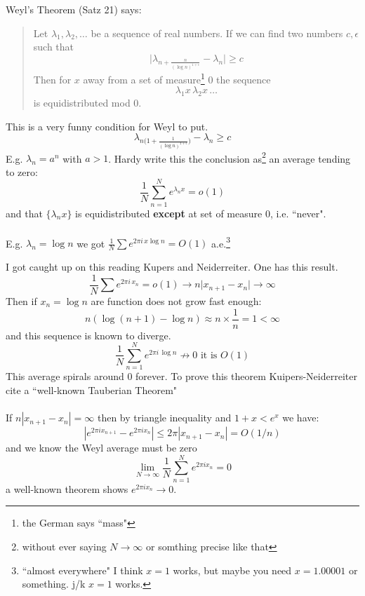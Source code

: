 \documentclass[12pt]{article}
\begin{document}
\newpage

\noindent Weyl's Theorem (Satz 21) says:
\begin{quotation}
Let $\lambda_1, \lambda_2, \dots $ be a sequence of real numbers. If we can find two numbers $c, \epsilon$ such that $$ \big| 
\lambda_{n + \frac{n}{(\log n)^{1+\epsilon}}} - \lambda_n\big| \geq c $$
Then for $x$ away from a set of measure\footnote{the German says ``mass"} 0 the sequence
$$ \lambda_1 x \, \lambda_2 x \, \dots $$
is equidistributed mod $0$.
\end{quotation}
This is a very funny condition for Weyl to put.
$$ \lambda_{n\big( 1 + \frac{1}{(\log n)^{1+\epsilon}}\big)} - \lambda_n \geq c$$
E.g. $\lambda_n = a^n$ with $a > 1$.  Hardy write this the conclusion as\footnote{without ever saying $N \to \infty$ or somthing precise like that} an average tending to zero:
$$ \frac{1}{N}\sum_{n=1}^N e^{\lambda_n x} = o(1)$$
and that $\{\lambda_n x\}$ is equidistributed \textbf{except} at set of measure 0, i.e. ``never". \\ \\
E.g. $\lambda_n = \log n$ we got $\frac{1}{N}\sum e^{2\pi i \, x \log n}  = O(1)$ a.e.\footnote{``almost everywhere" I think $x = 1$ works, but maybe you need $x = 1.00001$ or something.  j/k $x = 1$ works.}


\newpage

\noindent I got caught up on this reading Kupers and Neiderreiter.  One has this result.
$$ \frac{1}{N}\sum e^{2\pi i \, x_n}= o(1) \longrightarrow n \big|x_{n+1}-x_n \big| \to \infty$$
Then if $x_n = \log n$ are function does not grow fast enough:
$$ n (\log (n+1) - \log n) \approx n \times \frac{1}{n} = 1 < \infty $$
and this sequence is known to diverge.
$$ \frac{1}{N}\sum_{n=1}^N e^{2\pi i \, \log n } \not \to 0 \text{ it is }O(1)$$
This average spirals around $0$ forever.   To prove this theorem Kuipers-Neiderreiter cite a ``well-known Tauberian Theorem" \\ \\
If $n |x_{n+1}-x_n| = \infty $ then by triangle inequality and $1+x < e^x$ we have:
$$ |e^{2\pi i x_{n+1}}- e^{2\pi i x_n} |\leq 2\pi |x_{n+1}-x_n| = O(1/n) $$
and we know the Weyl average must be zero
$$ \lim_{N \to \infty }  \frac{1}{N} \sum_{n=1}^N e^{2\pi i x_n} = 0$$
a well-known theorem shows $e^{2\pi i x_n} \to 0$.

\newpage
\end{document}
